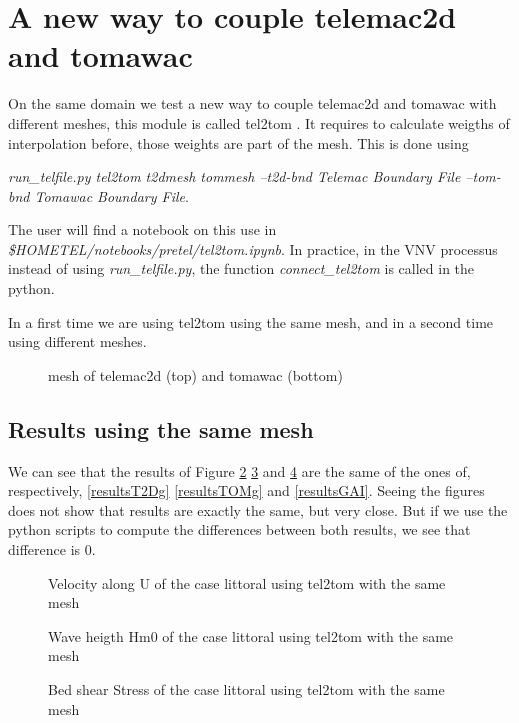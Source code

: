 \section{A new way to couple telemac2d and tomawac}
On the same domain we test a new way to couple telemac2d and tomawac with
different meshes, this module is called tel2tom \cite{breugem2019}. It
requires to calculate weigths of interpolation before, those weights are part
of the mesh. This is done using

{\it run\_telfile.py tel2tom t2dmesh tommesh --t2d-bnd Telemac Boundary File
  --tom-bnd Tomawac Boundary File}.

The user will find a notebook on this use in {\it
  \$HOMETEL/notebooks/pretel/tel2tom.ipynb}. In practice, in the VNV processus
instead of using {\it run\_telfile.py}, the function  {\it connect\_tel2tom}
is called in the python.

In a first time we are using tel2tom using the same mesh, and in a second time
using different meshes.

 \begin{figure} [!h]
 \centering
 \label{fondTEL2TOMg}
 \caption{mesh of telemac2d (top) and tomawac (bottom)}
 \end{figure}
  
\subsection{Results using the same mesh}
We can see that the results of Figure \ref{resultsTEL2TOMg} \ref{resultsTOM2TELg}
and \ref{resultsGAITEL2TOM} are the same of the ones of, respectively,
\ref{resultsT2Dg} \ref{resultsTOMg} and \ref{resultsGAI}. Seeing the figures does
not show that results are exactly the same, but very close. But if we use the
python scripts to compute the differences between both results, we see that
difference is 0.

\begin{figure} [!h]
\centering
{}
\caption{Velocity along U of the case littoral using tel2tom with the same
  mesh}
\label{resultsTEL2TOMg}
\end{figure}
\begin{figure} [!h]
\centering
{}
 \caption{Wave heigth Hm0 of the case littoral using tel2tom with the same mesh}
\label{resultsTOM2TELg}
\end{figure}
\begin{figure} [!h]
\centering
{}
\caption{Bed shear Stress of the case littoral using tel2tom with the same
  mesh}
\label{resultsGAITEL2TOM}
\end{figure}

